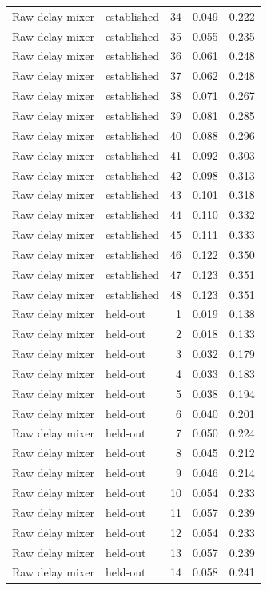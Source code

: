 \begin{tabular}{llrrr}
Raw delay mixer & established & 34 & 0.049 & 0.222 \\
Raw delay mixer & established & 35 & 0.055 & 0.235 \\
Raw delay mixer & established & 36 & 0.061 & 0.248 \\
Raw delay mixer & established & 37 & 0.062 & 0.248 \\
Raw delay mixer & established & 38 & 0.071 & 0.267 \\
Raw delay mixer & established & 39 & 0.081 & 0.285 \\
Raw delay mixer & established & 40 & 0.088 & 0.296 \\
Raw delay mixer & established & 41 & 0.092 & 0.303 \\
Raw delay mixer & established & 42 & 0.098 & 0.313 \\
Raw delay mixer & established & 43 & 0.101 & 0.318 \\
Raw delay mixer & established & 44 & 0.110 & 0.332 \\
Raw delay mixer & established & 45 & 0.111 & 0.333 \\
Raw delay mixer & established & 46 & 0.122 & 0.350 \\
Raw delay mixer & established & 47 & 0.123 & 0.351 \\
Raw delay mixer & established & 48 & 0.123 & 0.351 \\
Raw delay mixer & held-out & 1 & 0.019 & 0.138 \\
Raw delay mixer & held-out & 2 & 0.018 & 0.133 \\
Raw delay mixer & held-out & 3 & 0.032 & 0.179 \\
Raw delay mixer & held-out & 4 & 0.033 & 0.183 \\
Raw delay mixer & held-out & 5 & 0.038 & 0.194 \\
Raw delay mixer & held-out & 6 & 0.040 & 0.201 \\
Raw delay mixer & held-out & 7 & 0.050 & 0.224 \\
Raw delay mixer & held-out & 8 & 0.045 & 0.212 \\
Raw delay mixer & held-out & 9 & 0.046 & 0.214 \\
Raw delay mixer & held-out & 10 & 0.054 & 0.233 \\
Raw delay mixer & held-out & 11 & 0.057 & 0.239 \\
Raw delay mixer & held-out & 12 & 0.054 & 0.233 \\
Raw delay mixer & held-out & 13 & 0.057 & 0.239 \\
Raw delay mixer & held-out & 14 & 0.058 & 0.241 \\

\end{tabular}
